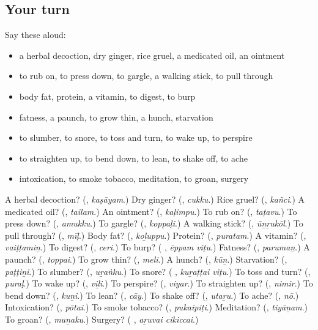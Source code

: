 \subsection*{Your turn}
Say these aloud:

\begin{itemize}
\raggedright
  \item a herbal decoction, dry ginger, rice gruel, a medicated oil, an ointment
  \item to rub on, to press down, to gargle, a walking stick, to pull through
  \item body fat, protein, a vitamin, to digest, to burp
  \item fatness, a paunch, to grow thin, a hunch, starvation
  \item to slumber, to snore, to toss and turn, to wake up, to perspire
  \item to straighten up, to bend down, to lean, to shake off, to ache
  \item intoxication, to smoke tobacco, meditation, to groan, surgery
\end{itemize}

\begin{tcolorbox}[breakable,colback=teal!4,colframe=teal!35!black,title={Before you move on}]
A herbal decoction? (\textbf{}, \emph{kaṣāyam}.) Dry ginger? (\textbf{}, \emph{cukku}.) Rice gruel? (\textbf{}, \emph{kañci}.) A medicated oil? (\textbf{}, \emph{tailam}.) An ointment? (\textbf{}, \emph{kaḷimpu}.) To rub on? (\textbf{}, \emph{taṭavu}.) To press down? (\textbf{}, \emph{amukku}.) To gargle? (\textbf{}, \emph{koppaḷi}.) A walking stick? (\textbf{}, \emph{ūṉṟukōl}.) To pull through? (\textbf{}, \emph{mīḷ}.) Body fat? (\textbf{}, \emph{koḻuppu}.) Protein? (\textbf{}, \emph{puratam}.) A vitamin? (\textbf{}, \emph{vaiṭṭamiṉ}.) To digest? (\textbf{}, \emph{ceri}.) To burp? (\textbf{ }, \emph{ēppam viṭu}.) Fatness? (\textbf{}, \emph{parumaṉ}.) A paunch? (\textbf{}, \emph{toppai}.) To grow thin? (\textbf{}, \emph{meli}.) A hunch? (\textbf{}, \emph{kūṉ}.) Starvation? (\textbf{}, \emph{paṭṭiṉi}.) To slumber? (\textbf{}, \emph{uṟaṅku}.) To snore? (\textbf{ }, \emph{kuṟaṭṭai viṭu}.) To toss and turn? (\textbf{}, \emph{puraḷ}.) To wake up? (\textbf{}, \emph{viḻi}.) To perspire? (\textbf{}, \emph{viyar}.) To straighten up? (\textbf{}, \emph{nimir}.) To bend down? (\textbf{}, \emph{kuṉi}.) To lean? (\textbf{}, \emph{cāy}.) To shake off? (\textbf{}, \emph{utaṟu}.) To ache? (\textbf{}, \emph{nō}.) Intoxication? (\textbf{}, \emph{pōtai}.) To smoke tobacco? (\textbf{}, \emph{pukaipiṭi}.) Meditation? (\textbf{}, \emph{tiyāṉam}.) To groan? (\textbf{}, \emph{muṉaku}.) Surgery? (\textbf{ }, \emph{aṟuvai cikiccai}.)
\end{tcolorbox}
